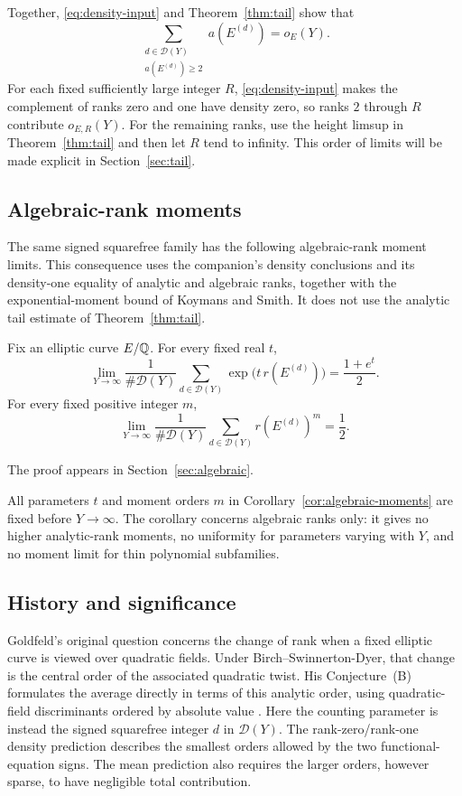 Together, \eqref{eq:density-input} and Theorem~\ref{thm:tail} show that
\[
 \sum_{\substack{d\in\mathcal D(Y)\\a(E^{(d)})\ge2}}a(E^{(d)})=o_E(Y).
\]
For each fixed sufficiently large integer \(R\), \eqref{eq:density-input}
makes the complement of ranks zero and one have density zero, so ranks
\(2\) through \(R\) contribute \(o_{E,R}(Y)\).
For the remaining ranks, use the height limsup in Theorem~\ref{thm:tail}
and then let \(R\) tend to infinity. This order of limits will be
made explicit in Section~\ref{sec:tail}.

\subsection{Algebraic-rank moments}

The same signed squarefree family has the following algebraic-rank
moment limits. This consequence uses the companion's density conclusions
and its density-one equality of analytic and algebraic ranks, together
with the exponential-moment bound of Koymans and Smith. It does not use
the analytic tail estimate of Theorem~\ref{thm:tail}.

\begin{corollary}\label{cor:algebraic-moments}
Fix an elliptic curve \(E/\mathbb Q\). For every fixed real \(t\),
\[
 \lim_{Y\to\infty}\frac1{\#\mathcal D(Y)}
 \sum_{d\in\mathcal D(Y)}\exp\!\bigl(t\,r(E^{(d)})\bigr)
 =\frac{1+e^t}{2}.
\]
For every fixed positive integer \(m\),
\[
 \lim_{Y\to\infty}\frac1{\#\mathcal D(Y)}
 \sum_{d\in\mathcal D(Y)}r(E^{(d)})^m=\frac12.
\]
\end{corollary}

The proof appears in Section~\ref{sec:algebraic}.

All parameters \(t\) and moment orders \(m\) in
Corollary~\ref{cor:algebraic-moments} are fixed before \(Y\to\infty\).
The corollary concerns algebraic ranks only: it gives no higher
analytic-rank moments, no uniformity for parameters varying with \(Y\),
and no moment limit for thin polynomial subfamilies.

\subsection{History and significance}

Goldfeld's original question concerns the change of rank when a fixed
elliptic curve is viewed over quadratic fields. Under
Birch--Swinnerton-Dyer, that change is the central order of the associated
quadratic twist. His Conjecture~(B) formulates the average directly in
terms of this analytic order, using quadratic-field discriminants
ordered by absolute value \cite[pp.~113--114]{Goldfeld1979}.
Here the counting parameter is instead the signed squarefree integer
\(d\) in \(\mathcal D(Y)\).
The rank-zero/rank-one density prediction describes the smallest orders
allowed by the two functional-equation signs. The mean prediction also
requires the larger orders, however sparse, to have negligible total
contribution.


